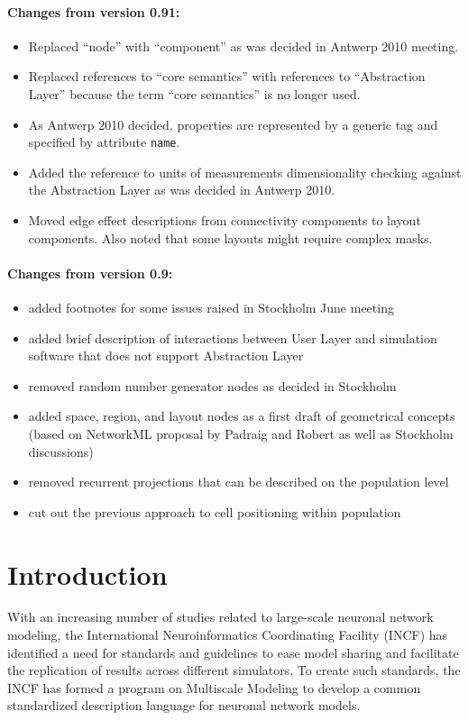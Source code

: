 \documentclass{article}
\begin{document}
\paragraph{Changes from version 0.91:}
\begin{itemize}
\item Replaced ``node'' with ``component'' as was decided in Antwerp 2010
meeting.
\item Replaced references to ``core semantics'' with references to
``Abstraction Layer''
because the term ``core semantics'' is no longer used.
\item As Antwerp 2010 decided, properties are represented by a generic
tag and specified
by attribute {\tt name}.
\item Added the reference to units of measurements dimensionality checking
against
the Abstraction Layer as was decided in Antwerp 2010.
\item Moved edge effect descriptions from connectivity components to layout
components. Also
noted that some layouts might require complex masks.
\end{itemize}

\paragraph{Changes from version 0.9:}
\begin{itemize}
\item added footnotes for some issues raised in Stockholm June meeting
\item added brief description of interactions between User Layer and
simulation software that does not support Abstraction Layer
\item removed random number generator nodes as decided in Stockholm
\item added space, region, and layout nodes as a first draft of geometrical
concepts (based on NetworkML proposal by Padraig and Robert as well as
Stockholm discussions)
\item removed recurrent projections that can be described on the population
level
\item cut out the previous approach to cell positioning within population
\end{itemize}
\newpage

\section{Introduction}

With an increasing number of studies related to large-scale neuronal
network modeling, the International Neuroinformatics Coordinating
Facility (INCF) has identified a need for standards and guidelines to
ease model sharing and facilitate the replication of results across
different simulators. To create such standards, the INCF has formed a
program on Multiscale Modeling to develop a common standardized
description language for neuronal network models.
\end{document}
